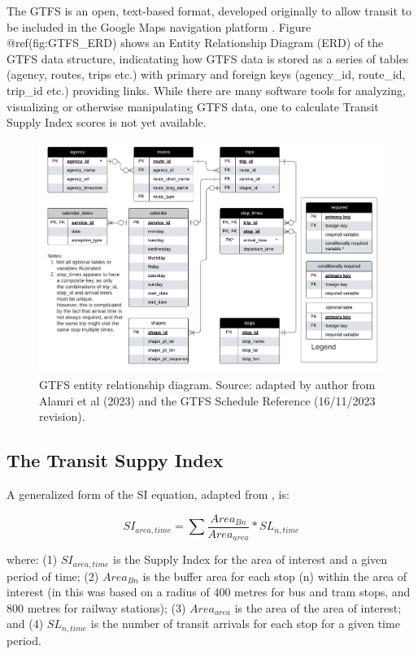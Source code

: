 \documentclass[preprint, 3p,
authoryear]{elsarticle} %
\begin{document}
The GTFS is an open, text-based format, developed originally to allow
transit to be included in the Google Maps navigation platform
\citep{GTFS}. Figure @ref(fig:GTFS\_ERD) shows an Entity Relationship
Diagram (ERD) of the GTFS data structure, indicatating how GTFS data is
stored as a series of tables (agency, routes, trips etc.) with primary
and foreign keys (agency\_id, route\_id, trip\_id etc.) providing links.
While there are many software tools for analyzing, visualizing or
otherwise manipulating GTFS data, one to calculate Transit Supply Index
scores is not yet available.

\begin{figure}
\includegraphics[width=1\linewidth]{graphics/GTFS} \caption{GTFS entity relationship diagram. Source: adapted by author from Alamri et al (2023) and the GTFS Schedule Reference (16/11/2023 revision).}\label{fig:GTFS_ERD}
\end{figure}

\hypertarget{the-transit-suppy-index}{%
\subsection{The Transit Suppy Index}\label{the-transit-suppy-index}}

A generalized form of the SI equation, adapted from
\citet{currie2010identifying}, is:

\[SI_{area, time} = \sum{\frac{Area_{Bn}}{Area_{area}}*SL_{n, time}}\]

where: (1) \(SI_{area, time}\) is the Supply Index for the area of
interest and a given period of time; (2) \(Area_{Bn}\) is the buffer
area for each stop (n) within the area of interest (in
\citet{currie2010identifying} this was based on a radius of 400 metres
for bus and tram stops, and 800 metres for railway stations); (3)
\(Area_{area}\) is the area of the area of interest; and (4)
\(SL_{n,time}\) is the number of transit arrivals for each stop for a
given time period.
\end{document}

